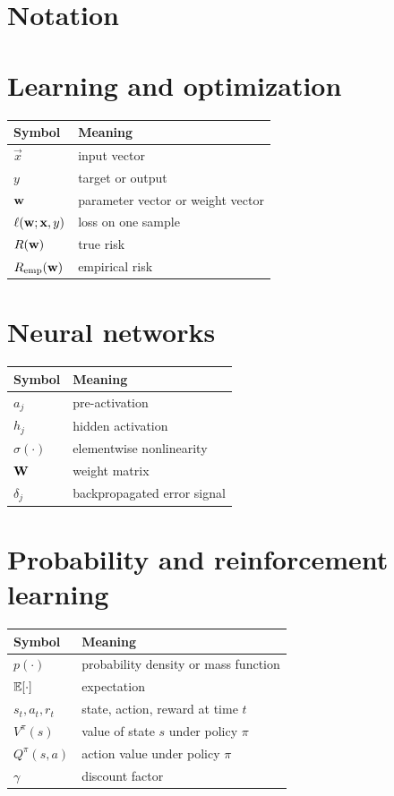 \section*{Notation}

\section*{Learning and optimization}

\begin{tabular}{@{}ll@{}}
  \toprule
  \textbf{Symbol} & \textbf{Meaning} \\
  \midrule
  $\vec{x}$ & input vector \\
  $y$ & target or output \\
  $\mathbf{w}$ & parameter vector or weight vector \\
  $\ell(\mathbf{w};\mathbf{x},y)$ & loss on one sample \\
  $R(\mathbf{w})$ & true risk \\
  $R_{\mathrm{emp}}(\mathbf{w})$ & empirical risk \\
  \bottomrule
\end{tabular}

\section*{Neural networks}

\begin{tabular}{@{}ll@{}}
  \toprule
  \textbf{Symbol} & \textbf{Meaning} \\
  \midrule
  $a_j$ & pre-activation \\
  $h_j$ & hidden activation \\
  $\sigma(\cdot)$ & elementwise nonlinearity \\
  $\mathbf{W}$ & weight matrix \\
  $\delta_j$ & backpropagated error signal \\
  \bottomrule
\end{tabular}

\section*{Probability and reinforcement learning}

\begin{tabular}{@{}ll@{}}
  \toprule
  \textbf{Symbol} & \textbf{Meaning} \\
  \midrule
  $p(\cdot)$ & probability density or mass function \\
  $\mathbb{E}[\cdot]$ & expectation \\
  $s_t, a_t, r_t$ & state, action, reward at time $t$ \\
  $V^\pi(s)$ & value of state $s$ under policy $\pi$ \\
  $Q^\pi(s,a)$ & action value under policy $\pi$ \\
  $\gamma$ & discount factor \\
  \bottomrule
\end{tabular}
